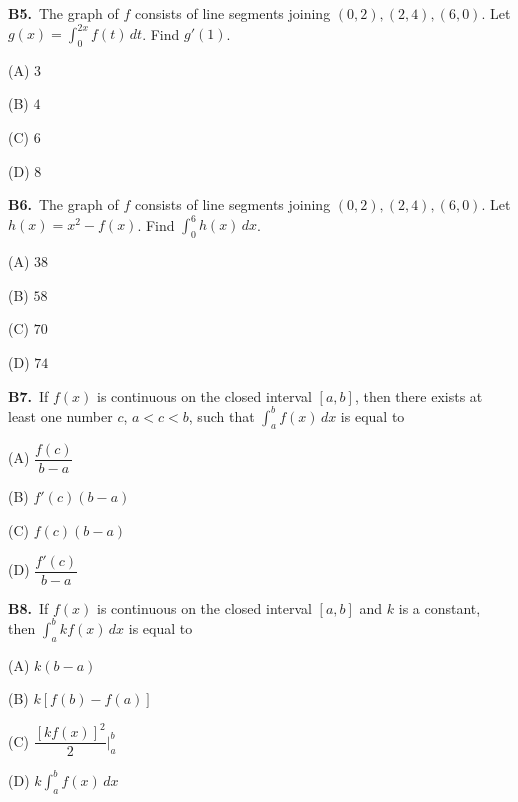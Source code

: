 \documentclass[11pt]{article}
\begin{document}
\bigskip\noindent\textbf{B5.}\ The graph of $f$ consists of line segments joining $(0,2),(2,4),(6,0)$. Let $g(x)=\int_0^{2x}f(t)\,dt$. Find $g\prime(1)$.
\begin{list}{}{\setlength{\leftmargin}{3em}\setlength{\labelwidth}{2.5em}\setlength{\itemsep}{0pt}\setlength{\topsep}{2pt}}
\item[(A)] $3$
\item[(B)] $4$
\item[(C)] $6$
\item[(D)] $8$
\end{list}

\bigskip\noindent\textbf{B6.}\ The graph of $f$ consists of line segments joining $(0,2),(2,4),(6,0)$. Let $h(x)=x^2-f(x)$. Find $\int_0^6h(x)\,dx$.
\begin{list}{}{\setlength{\leftmargin}{3em}\setlength{\labelwidth}{2.5em}\setlength{\itemsep}{0pt}\setlength{\topsep}{2pt}}
\item[(A)] $38$
\item[(B)] $58$
\item[(C)] $70$
\item[(D)] $74$
\end{list}

\bigskip\noindent\textbf{B7.}\ If $f(x)$ is continuous on the closed interval $[a,b]$, then there exists at least one number $c$, $a<c<b$, such that $\displaystyle\int_{a}^{b} f(x)\,dx$ is equal to
\begin{list}{}{\setlength{\leftmargin}{3em}\setlength{\labelwidth}{2.5em}\setlength{\itemsep}{0pt}\setlength{\topsep}{2pt}}
\item[(A)] $\dfrac{f(c)}{b-a}$
\item[(B)] $f'(c)(b-a)$
\item[(C)] $f(c)(b-a)$
\item[(D)] $\dfrac{f'(c)}{b-a}$
\end{list}

\bigskip\noindent\textbf{B8.}\ If $f(x)$ is continuous on the closed interval $[a,b]$ and $k$ is a constant, then $\displaystyle\int_{a}^{b} kf(x)\,dx$ is equal to
\begin{list}{}{\setlength{\leftmargin}{3em}\setlength{\labelwidth}{2.5em}\setlength{\itemsep}{0pt}\setlength{\topsep}{2pt}}
\item[(A)] $k(b-a)$
\item[(B)] $k[f(b)-f(a)]$
\item[(C)] $\dfrac{[kf(x)]^2}{2}\Big|_a^b$
\item[(D)] $k\displaystyle\int_{a}^{b} f(x)\,dx$
\end{list}
\end{document}
